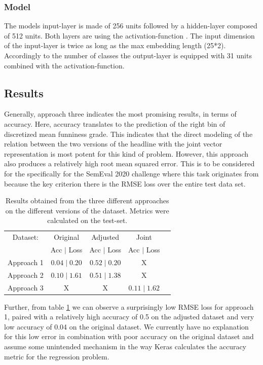 \documentclass[11pt,a4paper]{article}
\begin{document}
\subsubsection{Model}
The models input-layer is made of 256 units followed by a hidden-layer composed of 512 units. Both layers are using the activation-function . The input dimension of the input-layer is twice as long as the max embedding length (25*2). Accordingly to the number of classes the output-layer is equipped with 31 units combined with the  activation-function.


\newpage

\subsection{Results}
Generally, approach three indicates the most promising results, in terms of accuracy. Here, accuracy translates to the prediction of the right bin of discretized mean funniness grade. This indicates that the direct modeling of the relation between the two versions of the headline with the joint vector representation is most potent for this kind of problem. However, this approach also produces a relatively high root mean squared error. This is to be considered for the specifically for the SemEval 2020 challenge where this task originates from because the key criterion there is the RMSE loss over the entire test data set.

\begin{table}[]
\centering
\begin{tabular}{@{}ccccc@{}}
\toprule
Dataset: & Original & Adjusted & Joint &  \\ 
 & Acc $\mid$ Loss & Acc $\mid$ Loss & Acc $\mid$ Loss &  \\ \midrule
 Approach 1 & $0.04 \mid \mathbf{0.20}$ & $0.52 \mid \mathbf{0.20}$ & X &  \\
 Approach 2 & $0.10 \mid 1.61$ & $0.51 \mid 1.38$ & X &  \\
 Approach 3 & X & X & $\mathbf{0.11} \mid 1.62$ &  \\ \bottomrule
\end{tabular}
\caption{Results obtained from the three different approaches on the different versions of the dataset. Metrics were calculated on the test-set.}
\label{tab:results}
\end{table}

Further, from table \ref{tab:results} we can observe a surprisingly low RMSE loss for approach 1, paired with a relatively high accuracy of 0.5 on the adjusted dataset and very low accuracy of 0.04 on the original dataset. We currently have no explanation for this low error in combination with poor accuracy on the original dataset and assume some unintended mechanism in the way Keras calculates the accuracy metric for the regression problem. 
\end{document}
